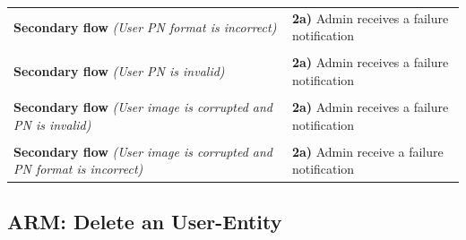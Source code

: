 \documentclass[a4paper,11pt]{article}
\begin{document}
\begin{tabular}{|p{3.5cm}|p{11.5cm}|}
    \\ \hline \rowcolor{Gray} & \\ \hline 
     
    \textbf{Secondary flow} \emph{(User PN format is incorrect)} & 
    \textbf{2a)} Admin receives a failure notification
    
   \\ \hline \rowcolor{Gray} & \\ \hline
    
    \textbf{Secondary flow} \emph{(User PN is invalid)} & 
    \textbf{2a)} Admin receives a failure notification
    
    \\ \hline \rowcolor{Gray} & \\ \hline
    
    \textbf{Secondary flow} \emph{(User image is corrupted and PN is invalid)} & 
    \textbf{2a)} Admin receives a failure notification
    
    \\ \hline \rowcolor{Gray} & \\ \hline
    
    \textbf{Secondary flow} \emph{(User image is corrupted and PN format is incorrect)} & 
    \textbf{2a)} Admin receive a failure notification
    
    \\\hline 
\end{tabular}


\newpage
\noindent

\subsection{ARM: Delete an User-Entity}
\end{document}
